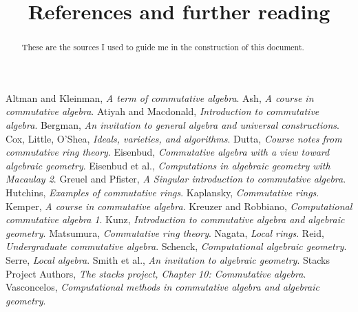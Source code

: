 \documentclass{ximera}
\title{References and further reading}
\begin{document}
\begin{abstract}
  These are the sources I used to guide me in the construction of this
  document.
\end{abstract}
\maketitle

\begin{thebibliography}{MMMM2002}
   Altman and Kleinman, \textit{A term of commutative algebra}.
   Ash, \textit{A course in commutative algebra}.
   Atiyah and Macdonald, \textit{Introduction to commutative algebra}.
   Bergman, \textit{An invitation to general algebra and universal constructions}.
   Cox, Little, O'Shea, \textit{Ideals, varieties, and algorithms}.
   Dutta, \textit{Course notes from commutative ring theory}.
   Eisenbud, \textit{Commutative algebra with a view toward algebraic geometry}.
   Eisenbud et al., \textit{Computations in algebraic geometry with Macaulay 2}.
   Greuel and Pfister, \textit{A Singular introduction to commutative algebra}.
   Hutchins, \textit{Examples of commutative rings}.
   Kaplansky, \textit{Commutative rings}.
   Kemper, \textit{A course in commutative algebra}.
   Kreuzer and Robbiano, \textit{Computational commutative algebra 1}.
   Kunz, \textit{Introduction to commutative algebra and algebraic geometry}.
   Matsumura, \textit{Commutative ring theory}.
   Nagata, \textit{Local rings}.
   Reid, \textit{Undergraduate commutative algebra}.
   Schenck, \textit{Computational algebraic geometry}.
   Serre, \textit{Local algebra}.
   Smith et al., \textit{An invitation to algebraic geometry}.
   Stacks Project Authors, \textit{The stacks project, Chapter 10: Commutative algebra}.
   Vasconcelos, \textit{Computational methods in commutative algebra and algebraic geometry}.
\end{thebibliography}
\end{document}
